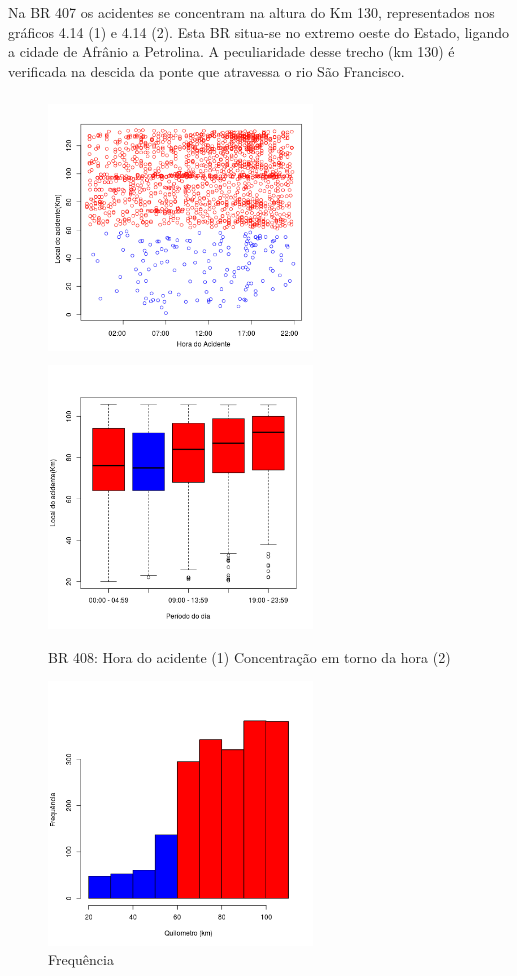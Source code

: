 Na BR 407 os acidentes se concentram na altura do Km 130, representados nos gráficos 4.14 (1) e 4.14 (2).
Esta BR situa-se no extremo oeste do Estado, ligando a cidade de Afrânio a Petrolina. A peculiaridade desse trecho (km 130) é verificada na descida da ponte que atravessa o rio São Francisco.

\pagebreak

\begin{figure}[h]
	\caption{BR 408: Hora do acidente (1) Concentração em torno da hora (2)}
	\includegraphics[width=7cm,height=7cm]{Figuras/Preprocess/br408_1.png}
	\includegraphics[width=7cm,height=7cm]{Figuras/Preprocess/br408_2.png}

\end{figure}

\quad \quad
\begin{figure}[h]
	\centering
	\caption{ Frequência}
	\includegraphics[width=7cm,height=7cm]{Figuras/Preprocess/br408_3.png}
\end{figure}

